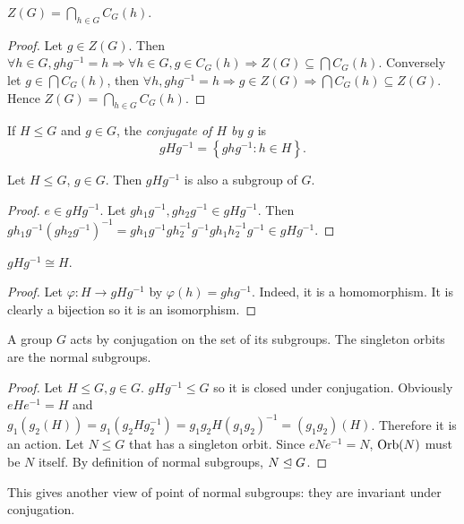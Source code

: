 \documentclass[a4paper]{article}
\begin{document}
      \begin{proposition}
          $\displaystyle Z(G)=\bigcap_{h\in G}C_G(h)$. 
      \end{proposition}
      \begin{proof}
          Let $g\in Z(G)$. Then $\forall h\in G, ghg^{-1}=h \Rightarrow \forall h\in G, g\in C_G(h) \Rightarrow Z(G)\subseteq \bigcap C_G(h)$. Conversely let $ g\in \bigcap C_G(h) $, then $ \forall h, ghg^{-1}=h \Rightarrow g\in Z(G) \Rightarrow \bigcap C_G(h) \subseteq Z(G) $. Hence $ Z(G)=\bigcap_{h\in G}C_G(h) $.
      \end{proof}
      \begin{definition}
          If $H\le G$ and $g\in G$, the \textit{conjugate of $H$ by $g$} is 
          \[
              gHg^{-1}=\left\{ ghg^{-1}:h\in H \right\}
          .\]
      \end{definition}
      \begin{proposition}\label{prop:5.21}
          Let $H\le G$, $g\in G$. Then $gHg^{-1}$ is also a subgroup of $G$.
      \end{proposition}
      \begin{proof}
          $e\in gHg^{-1}$. Let $gh_1g^{-1},gh_2g^{-1}\in gHg^{-1}$. Then $ gh_1g^{-1}(gh_2g^{-1})^{-1}=gh_1g^{-1}gh_2^{-1}g^{-1}gh_1h_2^{-1}g^{-1}\in gHg^{-1} $.
      \end{proof}
      \begin{proposition}
          $ gHg^{-1} \cong H $.
      \end{proposition}
      \begin{proof}
          Let $ \varphi: H \to gHg^{-1} $ by $ \varphi(h)=ghg^{-1} $. Indeed, it is a homomorphism. It is clearly a bijection so it is an isomorphism.
      \end{proof}
      \begin{proposition}\label{prop:5.22}
          A group $G$ acts by conjugation on the set of its subgroups. The singleton orbits are the normal subgroups.
      \end{proposition}
      \begin{proof}
          Let $H\le G, g\in G$. $ gHg^{-1}\le G $ so it is closed under conjugation. Obviously $ eHe^{-1}=H $ and $ g_1(g_2(H))=g_1(g_2Hg_2^{-1})=g_1g_2H(g_1g_2)^{-1}=(g_1g_2)(H) $. Therefore it is an action. Let $N \le G$ that has a singleton orbit. Since $eNe^{-1}=N$, $ \operatorname{Orb}(N) $ must be $N$ itself. By definition of normal subgroups, $ N \trianglelefteq G $.
      \end{proof}
      \begin{remark}
        This gives another view of point of normal subgroups: they are invariant under conjugation.
      \end{remark}
\end{document}
